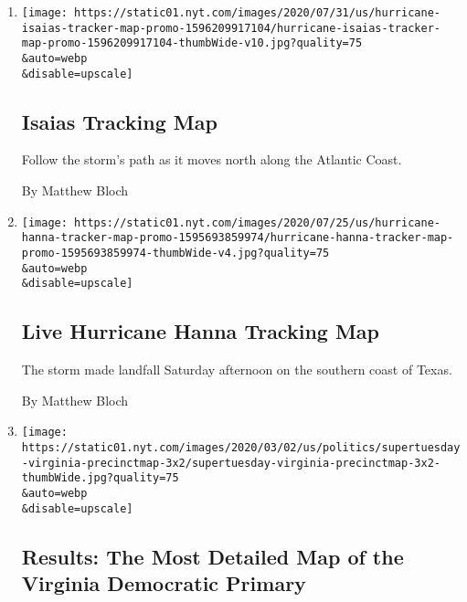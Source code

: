 \begin{enumerate}
\def\labelenumi{\arabic{enumi}.}
\item
  \href{/interactive/2020/07/31/us/hurricane-isaias-tracker-map.html}{}

  \texttt{[image: https://static01.nyt.com/images/2020/07/31/us/hurricane-isaias-tracker-map-promo-1596209917104/hurricane-isaias-tracker-map-promo-1596209917104-thumbWide-v10.jpg?quality=75\\\&auto=webp\\\&disable=upscale]}

  \hypertarget{isaias-tracking-map}{%
  \subsection{Isaias Tracking Map}\label{isaias-tracking-map}}

  Follow the storm's path as it moves north along the Atlantic Coast.

  By Matthew Bloch
\item
  \href{/interactive/2020/07/25/us/hurricane-hanna-tracker-map.html}{}

  \texttt{[image: https://static01.nyt.com/images/2020/07/25/us/hurricane-hanna-tracker-map-promo-1595693859974/hurricane-hanna-tracker-map-promo-1595693859974-thumbWide-v4.jpg?quality=75\\\&auto=webp\\\&disable=upscale]}

  \hypertarget{live-hurricane-hanna-tracking-map}{%
  \subsection{Live Hurricane Hanna Tracking
  Map}\label{live-hurricane-hanna-tracking-map}}

  The storm made landfall Saturday afternoon on the southern coast of
  Texas.

  By Matthew Bloch
\item
  \href{/interactive/2020/03/03/us/elections/precinct-map-virginia-primary.html}{}

  \texttt{[image: https://static01.nyt.com/images/2020/03/02/us/politics/supertuesday-virginia-precinctmap-3x2/supertuesday-virginia-precinctmap-3x2-thumbWide.jpg?quality=75\\\&auto=webp\\\&disable=upscale]}

  \hypertarget{results-the-most-detailed-map-of-the-virginia-democratic-primary}{%
  \subsection{Results: The Most Detailed Map of the Virginia Democratic
  Primary}\label{results-the-most-detailed-map-of-the-virginia-democratic-primary}}


\end{enumerate}

